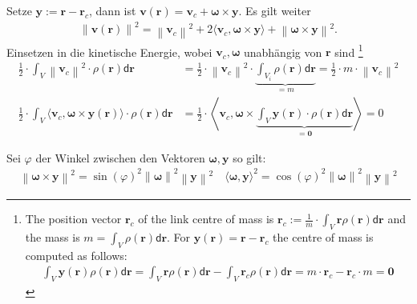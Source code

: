 \documentclass[a4paper, 12pt]{scrartcl}
\newcommand{\norm}[1]{\left\lVert#1\right\lVert}
\begin{document}
\begin{beweis}
    Setze $\bm{y} := \bm{r} - \bm{r}_c$, dann ist 
    $\bm{v}(\bm{r}) = \bm{v}_c + \bm{\omega} \times \bm{y}$.
    Es gilt weiter
    \begin{align*}
        \norm{\bm{v}(\bm{r})}^2
        = \norm{\bm{v}_c}^2
        + 2 \langle \bm{v}_c, \bm{\omega} \times \bm{y} \rangle
        + \norm{\bm{\omega} \times \bm{y}}^2.
    \end{align*}
    Einsetzen in die kinetische Energie, wobei $\bm{v}_c, \bm{\omega}$
    unabhängig von $\bm{r}$ sind \footnote{
        The position vector $\bm{r}_c$ of the link centre of mass is 
        $\bm{r}_c := \frac{1}{m} \cdot \int_V \bm{r} \rho(\bm{r}) \mathsf{d}\bm{r}$
        and the mass is $ m  = \int_V \rho(\bm{r}) \mathsf{d}\bm{r}$.
        For $\bm{y}(\bm{r})= \bm{r} - \bm{r}_c$ the centre of mass is computed as follows:
        \begin{align*}
            \int_V \bm{y}(\bm{r}) \rho(\bm{r}) \mathsf{d}\bm{r}
            =
            \int_V \bm{r} \rho(\bm{r}) \mathsf{d}\bm{r} 
            -
            \int_V \bm{r}_c \rho(\bm{r}) \mathsf{d}\bm{r}
            =
            m \cdot \bm{r}_c - \bm{r}_c \cdot m  = \bm{0}
        \end{align*}
    }
    \begin{align*}
        \frac{1}{2} \cdot \int_{V} \norm{\bm{v}_c}^2 \cdot \rho(\bm{r}) \mathsf{d}\bm{r} 
        &=
        \frac{1}{2} \cdot 
        \norm{\bm{v}_c}^2 \cdot
        \underbrace{
            \int_{V_i} \rho(\bm{r}) \mathsf{d}\bm{r} 
        }_{= m}
        =
        \frac{1}{2} \cdot 
        m \cdot \norm{\bm{v}_c}^2 
        \\
        \frac{1}{2} \cdot 
        \int_{V} \langle \bm{v}_c, \bm{\omega} \times \bm{y}(\bm{r}) \rangle 
        \cdot \rho(\bm{r}) \mathsf{d}\bm{r}
        &=
        \frac{1}{2} \cdot 
        \left\langle 
            \bm{v}_c, 
            \bm{\omega} 
            \times 
            \underbrace{
                \int_{V} \bm{y}(\bm{r}) \cdot \rho(\bm{r}) \mathsf{d}\bm{r}
            }_{= \bm{0}} 
        \right\rangle 
        = 0
    \end{align*}
    
    Sei $\varphi$ der Winkel zwischen den Vektoren $\bm{\omega},\bm{y}$ so gilt:
    \begin{align*}
        \norm{\bm{\omega} \times \bm{y}}^2 
        = 
        \sin(\varphi)^2 \norm{\bm{\omega}}^2 \norm{\bm{y}}^2
        \quad
        \langle \bm{\omega} ,\bm{y}\rangle^2
        =
        \cos(\varphi)^2 \norm{\bm{\omega}}^2 \norm{\bm{y}}^2
    \end{align*}


\end{beweis}
\end{document}
